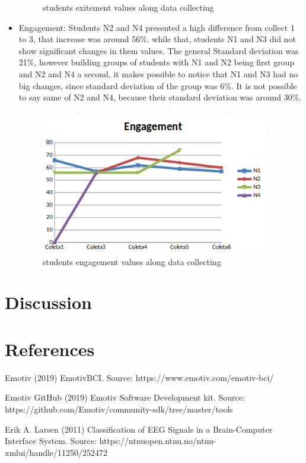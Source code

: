\documentclass[12pt,openright,a4paper]{article}
\begin{document}
\begin{itemize}
\begin{figure}[H]
 	     	\caption{students exitement values along data collecting}
 	     \end{figure}
 	\item Engagement: Students N2 and N4 presented a high difference from collect 1 to 3, that increase was around 56\%. while that, students N1 and N3 did not show significant changes in them values. The general Standard deviation was 21\%, however building groups of students with N1 and N2 being first group and N2 and N4 a second, it makes possible to notice that N1 and N3 had no big changes, since standard deviation of the group was 6\%. It is not possible to say same of N2 and N4, because their standard deviation was around 30\%.       
 	    \begin{figure}[H]
 	   	\centering
 	   	\includegraphics[width=10cm]{./engagement.png}
 	   	\caption{students engagement values along data collecting}
 	   \end{figure}
 \end{itemize}
\section{Discussion}
\newpage
\section{References}

  Emotiv (2019) EmotivBCI. Source: https://www.emotiv.com/emotiv-bci/ \newline
  
  Emotiv GitHub (2019) Emotiv Software Development kit. Source: https://github.com/Emotiv/community-sdk/tree/master/tools \newline
  
  Erik A. Larsen (2011) Classification of EEG Signals in a Brain-Computer Interface System. Source: https://ntnuopen.ntnu.no/ntnu-xmlui/handle/11250/252472 \newline
  
\end{document}
